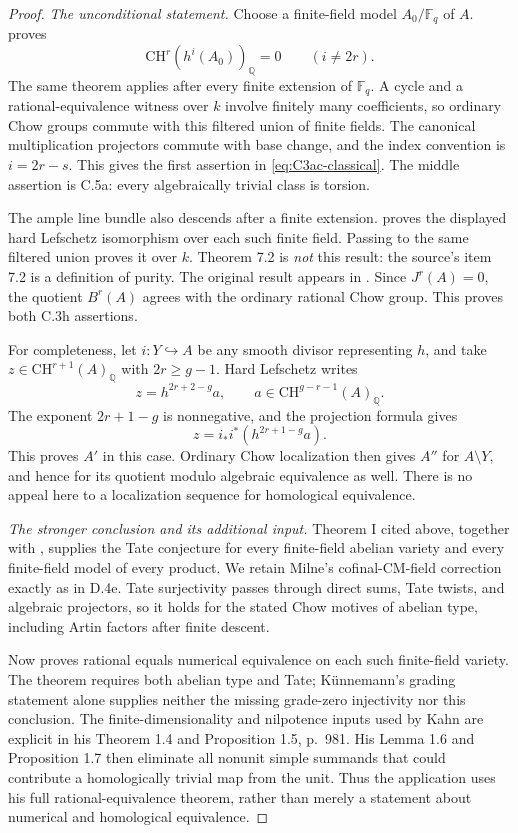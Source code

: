 \begin{proof}
\emph{The unconditional statement.}
Choose a finite-field model $A_0/\mathbb F_q$ of $A$.
\citet[Theorem 7.1, pp.~99--100]{cyKunnemann1993} proves
\[
       \mathrm{CH}^r(h^i(A_0))_{\mathbb Q}=0
                    \qquad(i\ne2r).
\]
The same theorem applies after every finite extension of
$\mathbb F_q$. A cycle and a rational-equivalence witness
over $k$ involve finitely many coefficients, so ordinary Chow
groups commute with this filtered union of finite fields.
The canonical multiplication projectors commute with base
change, and the index convention is $i=2r-s$. This gives the
first assertion in \eqref{eq:C3ac-classical}. The middle
assertion is C.5a: every algebraically trivial class is torsion.

The ample line bundle also descends after a finite extension.
\citet[Theorem 7.3, p.~100]{cyKunnemann1993} proves the
displayed hard Lefschetz isomorphism over each such finite
field. Passing to the same filtered union proves it over $k$.
Theorem 7.2 is \emph{not} this result: the source's item 7.2
is a definition of purity. The original result appears in
\citet[\S3.4, Theorem 7, pp.~339--341]{cySoule1984}.
Since $J^r(A)=0$, the quotient $B^r(A)$ agrees with the
ordinary rational Chow group. This proves both C.3h assertions.

For completeness, let $i:Y\hookrightarrow A$ be any smooth
divisor representing $h$, and take $z\in\mathrm{CH}^{r+1}(A)_{
\mathbb Q}$ with $2r\ge g-1$. Hard Lefschetz writes
\[
 z=h^{2r+2-g}a,\qquad
 a\in\mathrm{CH}^{g-r-1}(A)_{\mathbb Q}.
\]
The exponent $2r+1-g$ is nonnegative, and the projection
formula gives
\[
 z=i_*i^*(h^{2r+1-g}a).
\]
This proves $A'$ in this case. Ordinary Chow localization
then gives $A''$ for $A\setminus Y$, and hence for its
quotient modulo algebraic equivalence as well. There is no
appeal here to a localization sequence for homological
equivalence.

\emph{The stronger conclusion and its additional input.}
Theorem I cited above, together with
\citet[Theorem 7.1, author p.~25]{D_Milne1999}, supplies the
Tate conjecture for every finite-field abelian variety and
every finite-field model of every product. We retain Milne's
cofinal-CM-field correction exactly as in D.4e. Tate
surjectivity passes through direct sums, Tate twists, and
algebraic projectors, so it holds for the stated Chow motives
of abelian type, including Artin factors after finite descent.

Now \citet[Definition 1, p.~978; Theorem 1.10, p.~982]{cyKahn2003}
proves rational equals numerical equivalence on each such
finite-field variety. The theorem requires both abelian type
and Tate; K\"unnemann's grading statement alone supplies
neither the missing grade-zero injectivity nor this conclusion.
The finite-dimensionality and nilpotence inputs used by Kahn
are explicit in his Theorem 1.4 and Proposition 1.5, p.~981.
His Lemma 1.6 and Proposition 1.7 then eliminate all nonunit
simple summands that could contribute a homologically trivial
map from the unit. Thus the application uses his full
rational-equivalence theorem, rather than merely a statement
about numerical and homological equivalence.


\end{proof}
